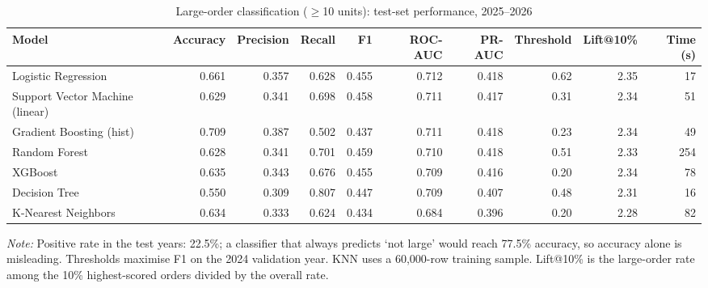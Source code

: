 \begin{table}[htbp]
\centering
\footnotesize
\caption{Large-order classification ($\geq$10 units): test-set performance, 2025--2026}
\label{tab:classification}
\begin{adjustbox}{max width=\linewidth}
\begin{tabular}{lrrrrrrrrr}
\toprule
\textbf{Model} & \textbf{Accuracy} & \textbf{Precision} & \textbf{Recall} & \textbf{F1} & \textbf{ROC-AUC} & \textbf{PR-AUC} & \textbf{Threshold} & \textbf{Lift@10\%} & \textbf{Time (s)} \\
\midrule
Logistic Regression & 0.661 & 0.357 & 0.628 & 0.455 & 0.712 & 0.418 & 0.62 & 2.35 & 17 \\
Support Vector Machine (linear) & 0.629 & 0.341 & 0.698 & 0.458 & 0.711 & 0.417 & 0.31 & 2.34 & 51 \\
Gradient Boosting (hist) & 0.709 & 0.387 & 0.502 & 0.437 & 0.711 & 0.418 & 0.23 & 2.34 & 49 \\
Random Forest & 0.628 & 0.341 & 0.701 & 0.459 & 0.710 & 0.418 & 0.51 & 2.33 & 254 \\
XGBoost & 0.635 & 0.343 & 0.676 & 0.455 & 0.709 & 0.416 & 0.20 & 2.34 & 78 \\
Decision Tree & 0.550 & 0.309 & 0.807 & 0.447 & 0.709 & 0.407 & 0.48 & 2.31 & 16 \\
K-Nearest Neighbors & 0.634 & 0.333 & 0.624 & 0.434 & 0.684 & 0.396 & 0.20 & 2.28 & 82 \\
\bottomrule
\end{tabular}
\end{adjustbox}
\par\smallskip\parbox{0.92\linewidth}{\footnotesize\emph{Note:} Positive rate in the test years: 22.5\%; a classifier that always predicts `not large' would reach 77.5\% accuracy, so accuracy alone is misleading. Thresholds maximise F1 on the 2024 validation year. KNN uses a 60,000-row training sample. Lift@10\% is the large-order rate among the 10\% highest-scored orders divided by the overall rate.}
\end{table}